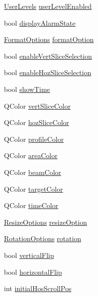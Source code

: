 \begin{DoxyCompactItemize}
\item 
\hyperlink{classQEImage_afc6169e5bb55dd0d3757ba09e3afe335}{UserLevels} \hyperlink{classQEImage_a25b8ba9d335dce7a4fd1eb9de3c62446}{userLevelEnabled}
\item 
bool \hyperlink{classQEImage_ac34bc84d987190c91bcf10767819c375}{displayAlarmState}
\item 
\hyperlink{classQEImage_a6595b537ab12bff146c508d0fcb3ae3b}{FormatOptions} \hyperlink{classQEImage_a6573f94a03c74c8356404e712055d762}{formatOption}
\item 
bool \hyperlink{classQEImage_a740a4d76d07779009cc244dfc8543a85}{enableVertSliceSelection}
\item 
bool \hyperlink{classQEImage_adc8455250e7fb3f790001d8458971df9}{enableHozSliceSelection}
\item 
bool \hyperlink{classQEImage_a51abf900097601e100eb03060ca173dc}{showTime}
\item 
QColor \hyperlink{classQEImage_ab5da21cd9976c568c4570ef51e055c4e}{vertSliceColor}
\item 
QColor \hyperlink{classQEImage_a9e69a916b1c656c1be7bc07727294756}{hozSliceColor}
\item 
QColor \hyperlink{classQEImage_a51e836fac19a11f9199791c40e27b850}{profileColor}
\item 
QColor \hyperlink{classQEImage_ad44e666dbc8ceadc207a25494be80762}{areaColor}
\item 
QColor \hyperlink{classQEImage_ae69b7be04428ccdad5dffceae756f98f}{beamColor}
\item 
QColor \hyperlink{classQEImage_a1665fe2a8c463babc9045f3470d0b161}{targetColor}
\item 
QColor \hyperlink{classQEImage_a8ee7300a0ecea621cd6c7196e36cab3f}{timeColor}
\item 
\hyperlink{classQEImage_af9f3e6c8c2bbadf453a2354e7b14c615}{ResizeOptions} \hyperlink{classQEImage_a04b44c02ff4adaf1d2980af059a91610}{resizeOption}
\item 
\hyperlink{classQEImage_a91596a1f020e3a40b106dcf82c3b7f9c}{RotationOptions} \hyperlink{classQEImage_abf8684a4faa9c5de9e85e760894ea463}{rotation}
\item 
bool \hyperlink{classQEImage_a0b4219b866cd2e75d70e1b58da369bae}{verticalFlip}
\item 
bool \hyperlink{classQEImage_a7d9073921f69d33b64c48c273a98ef31}{horizontalFlip}
\item 
int \hyperlink{classQEImage_ab73dc427e7df7dacbdd4ca1a5df84eab}{initialHosScrollPos}
\end{DoxyCompactItemize}


